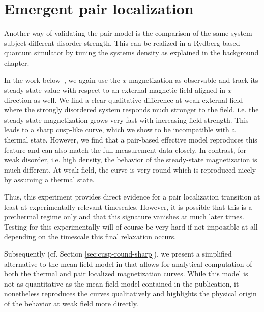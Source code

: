 \newpage
{}


\section{Emergent pair localization}
Another way of validating the pair model is the comparison of the same system subject different disorder strength. This can be realized in a Rydberg based quantum simulator by tuning the systems density as explained in the background chapter. %

In the work below~\cite{franzEmergentPairLocalization2022}, we again use the $x$-magnetization as observable and track its steady-state value with respect to an external magnetic field aligned in $x$-direction as well. We find a clear qualitative difference at weak external field where the strongly disordered system responds much stronger to the field, i.e. the steady-state magnetization grows very fast with increasing field strength. This leads to a sharp cusp-like curve, which we show to be incompatible with a thermal state. However, we find that a pair-based effective model reproduces this feature and can also match the full measurement data closely.
In contrast, for weak disorder, i.e. high density, the behavior of the steady-state magnetization is much different. At weak field, the curve is very round which is reproduced nicely by assuming a thermal state.

Thus, this experiment provides direct evidence for a pair localization transition at least at experimentally relevant timescales. However, it is possible that this is a prethermal regime only and that this signature vanishes at much later times. Testing for this experimentally will of course be very hard if not impossible at all depending on the timescale this final relaxation occurs.

Subsequently (cf. Section \ref{sec:cusp-round-sharp}), we present a simplified alternative to the mean-field model in \cite{franzEmergentPairLocalization2022} that allows for analytical computation of both the thermal and pair localized magnetization curves. While this model is not as quantitative as the mean-field model contained in the publication, it nonetheless reproduces the curves qualitatively and highlights the physical origin of the behavior at weak field more directly.

\newpage
{}


